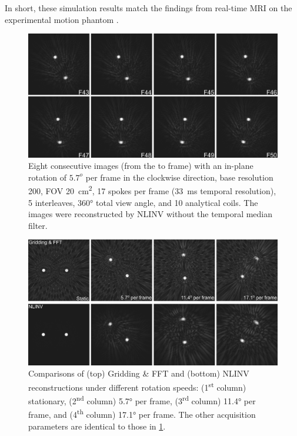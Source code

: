 In short, these simulation results match the findings from real-time MRI on the experimental motion phantom \cite{2014_Temp_Fidelity}.
\begin{figure}[tb]
  \centering
  \includegraphics[width=\textwidth]{fig/sim-motion-halfPos.png}
  \caption{Eight consecutive images (from the  to  frame) with an in-plane rotation of $5.7^o$ per frame in the clockwise direction, base resolution 200, FOV \SI{20}{\square\cm}, \num{17} spokes per frame (\SI{33}{\ms} temporal resolution), \num{5} interleaves, \ang{360} total view angle, and \num{10} analytical coils. The images were reconstructed by NLINV without the temporal median filter.} \label{Fig:sim-motion-halfPos}
\end{figure}

\begin{figure}[tb]
  \centering
  \includegraphics[width=\textwidth]{fig/sim-motion-comp.png}
  \caption{Comparisons of (top) Gridding \& FFT and (bottom) NLINV reconstructions under different rotation speeds: (1\textsuperscript{st} column) stationary, (2\textsuperscript{nd} column) \ang{5.7} per frame, (3\textsuperscript{rd} column) \ang{11.4} per frame, and (4\textsuperscript{th} column) \ang{17.1} per frame. The other acquisition parameters are identical to those in \cref{Fig:sim-motion-halfPos}.} \label{Fig:sim-motion-comp}
\end{figure}
